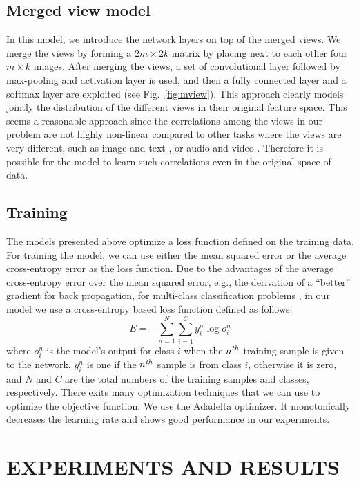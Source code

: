 \documentclass{article}
\begin{document}
\subsection{Merged view model}
In this model, we introduce the network layers on top of the merged views. We merge the views by forming a $2m \times 2k$ matrix by placing next to each other four $m \times k$ images. After merging the views, a set of convolutional layer followed by max-pooling and activation layer is used, and then a fully connected layer and a softmax layer are exploited (see Fig.~\ref{fig:mview}).
This approach clearly models jointly the distribution of the different views in their original feature space. This seems a reasonable approach since the correlations among the views in our problem are not highly non-linear compared to other tasks where the views are very different, such as image and text \cite{srivastava2012multimodal}, or audio and video \cite{ngiam2011multimodal}. Therefore it is possible for the model to learn such correlations even in the original space of data.
\subsection{Training}
The models presented above optimize a loss function defined on the training data. For training the model, we can use either the mean squared error or the average cross-entropy error as the loss function. Due to the advantages of the average cross-entropy error over the mean squared error, e.g., the derivation of a ``better'' gradient for back propagation, for multi-class classification problems \cite{golik2013cross}, in our model we use a cross-entropy based loss function defined as follows: 
\begin{equation}
E = -\sum_{n=1}^{N} \sum_{i=1}^{C} y_i^n \log o_i^n
\end{equation}
\noindent
where $o_i^n$ is the model's output for class $i$ when the $n^{\textrm{\textit{th}}}$ training sample is given to the network, $y_i^n$ is one if the $n^{\textrm{\textit{th}}}$ sample is from class $i$, otherwise it is zero, and $N$ and $C$ are the total numbers of the training samples and classes, respectively. There exits many optimization techniques \cite{zeiler2012adadelta,opt,vahid1,vahid2} that we can use to optimize the objective function. We use the Adadelta \cite{zeiler2012adadelta} optimizer. It monotonically decreases the learning rate and shows good performance in our experiments. 

\section{EXPERIMENTS AND RESULTS}
\label{sec:exp}
\end{document}
